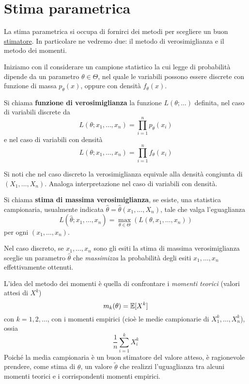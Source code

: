 \section{Stima parametrica}
La stima parametrica si occupa di fornirci dei metodi per scegliere un buon
\hyperref[def: stimatore]{stimatore}. In particolare ne vedremo due: il metodo di verosimiglianza
e il metodo dei momenti.

Iniziamo con il considerare un campione statistico la cui legge di probabilità dipende da un
parametro $\theta \in \Theta$, nel quale le variabili possono essere discrete con funzione di
massa $p_\theta(x)$, oppure con densità $f_\theta(x)$.

\begin{definition}
	Si chiama \textbf{funzione di verosimiglianza} la funzione $L(\theta; \dots)$ definita, nel
	caso di variabili discrete da
	\[ L(\theta; x_1, \ldots, x_n) = \prod_{i=1}^n p_\theta(x_i) \]
	e nel caso di variabili con densità
	\[ L(\theta; x_1, \ldots, x_n) = \prod_{i=1}^n f_\theta(x_i) \]
\end{definition}

Si noti che nel caso discreto la verosimiglianza equivale alla densità congiunta di
$(X_1, \dots, X_n)$. Analoga interpretazione nel caso di variabili con densità.

\begin{definition}
	Si chiama \textbf{stima di massima verosimiglianza}, se esiste, una statistica campionaria,
	usualmente indicata $\hat{\theta} = \hat{\theta} (x_1, \dots, X_n)$, tale che valga
	l'eguaglianza
	\[ L(\hat{\theta}; x_1, \dots, x_n) = \max_{\theta \in \Theta} (L(\theta, x_1, \dots, x_n)) \]
	per ogni $(x_1, \dots, x_n)$.
\end{definition}

Nel caso discreto, se $x_1, \dots, x_n$ sono gli esiti la stima di massima verosimiglianza sceglie
un parametro $\hat{\theta}$ che \emph{massimizza} la probabilità degli esiti $x_1, \dots, x_n$
effettivamente ottenuti.

L'idea del metodo dei momenti è quella di confrontare i \emph{momenti teorici} (valori attesi di
$X^k$)
\[ m_k(\theta) = \mathbb{E}[X^k] \]
con $k =1,2,\dots$, con i momenti empirici (cioè le medie campionarie di $X_1^k, \dots, X_n^k$),
ossia
\[ \frac{1}{n} \sum_{i=1}^k X_i^k \]
Poiché la media campionaria è un buon stimatore del valore atteso, è ragionevole prendere, come
stima di $\theta$, un valore $\tilde{\theta}$ che realizzi l'uguaglianza tra alcuni momenti teorici
e i corrispondenti momenti empirici.
